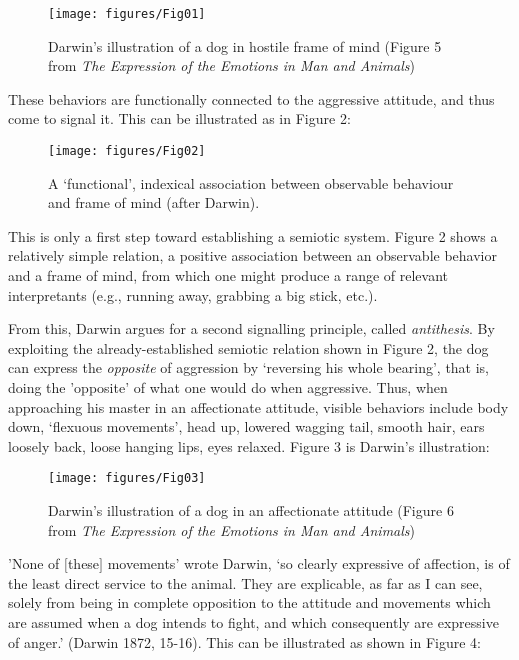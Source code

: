 \begin{figure}[h!]
\texttt{[image: figures/Fig01]}
\caption{Darwin's illustration of a dog in hostile frame of mind 
(Figure 5 from \textit{The Expression of the Emotions in Man and 
Animals})}
\end{figure}



These behaviors are functionally connected to the aggressive attitude, 
and thus come to signal it. This can be illustrated as in Figure 2:

\begin{figure}[h!]
\texttt{[image: figures/Fig02]}
\caption{A \textquoteleft functional', indexical association between observable 
behaviour and frame of mind (after Darwin).}
\end{figure}


This is only a first step toward establishing a semiotic system. Figure 
2 shows a relatively simple relation, a positive association between an 
observable behavior and a frame of mind, from which one might produce a 
range of relevant interpretants (e.g., running away, grabbing a big 
stick, etc.). 



From this, Darwin argues for a second signalling principle, called 
\textit{antithesis}. By exploiting the already-established semiotic 
relation shown in Figure 2, the dog can express the \textit{opposite} 
of aggression by \textquoteleft reversing his whole bearing', that is, doing the 
'opposite' of what one would do when aggressive. Thus, when approaching 
his master in an affectionate attitude, visible behaviors include body 
down, \textquoteleft flexuous movements', head up, lowered wagging tail, smooth hair, 
ears loosely back, loose hanging lips, eyes relaxed. Figure 3 is 
Darwin's illustration:


\begin{figure}[h!]
\texttt{[image: figures/Fig03]}
\caption{Darwin's illustration of a dog in an affectionate attitude 
(Figure 6 from \textit{The Expression of the Emotions in Man and 
Animals})}
\end{figure}




'None of $[$these$]$ movements' wrote Darwin, \textquoteleft so clearly expressive of 
affection, is of the least direct service to the animal. They are 
explicable, as far as I can see, solely from being in complete 
opposition to the attitude and movements which are assumed when a dog 
intends to fight, and which consequently are expressive of anger.' 
(Darwin 1872, 15-16). This can be illustrated as shown in Figure 4:


